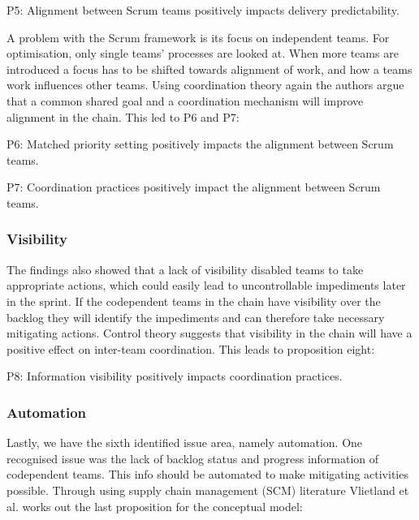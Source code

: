\begin{fancyquotes}
P5: Alignment between Scrum teams positively impacts delivery predictability.
\end{fancyquotes}

A problem with the Scrum framework is its focus on independent teams. For optimisation, only single teams' processes are looked at. When more teams are introduced a focus has to be shifted towards alignment of work, and how a teams work influences other teams. Using coordination theory again the authors argue that a common shared goal and a coordination mechanism will improve alignment in the chain. This led to P6 and P7:

\begin{fancyquotes}
P6: Matched priority setting positively impacts the alignment between Scrum teams.
\end{fancyquotes}

\begin{fancyquotes}
P7: Coordination practices positively impact the alignment between Scrum teams.
\end{fancyquotes}

\subsubsection{Visibility}

The findings also showed that a lack of visibility disabled teams to take appropriate actions, which could easily lead to uncontrollable impediments later in the sprint. If the codependent teams in the chain have visibility over the backlog they will identify the impediments and can therefore take necessary mitigating actions. Control theory suggests that visibility in the chain will have a positive effect on inter-team coordination. This leads to proposition eight:

\begin{fancyquotes}
P8: Information visibility positively impacts coordination practices.
\end{fancyquotes}

\subsubsection{Automation}

Lastly, we have the sixth identified issue area, namely automation. One recognised issue was the lack of backlog status and progress information of codependent teams. This info should be automated to make mitigating activities possible. Through using supply chain management (SCM) literature Vlietland et al. works out the last proposition for the conceptual model:

